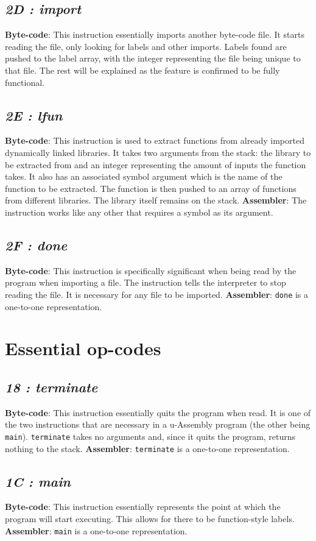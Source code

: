 \documentclass[12pt]{report}
\begin{document}
  \subsection{\emph{2D : import}}
  \textbf{Byte-code}: This instruction essentially imports another byte-code file.  It
  starts reading the file, only looking for labels and other imports.  Labels found are
  pushed to the label array, with the integer representing the file being unique to
  that file.  The rest will be explained as the feature is confirmed to be fully
  functional.
  \subsection{\emph{2E : lfun}}
  \textbf{Byte-code}: This instruction is used to extract functions from already
  imported dynamically linked libraries.  It takes two arguments from the stack:
  the library to be extracted from and an integer representing the amount of inputs
  the function takes.  It also has an associated symbol argument which is the name
  of the function to be extracted.  The function is then pushed to an array of
  functions from different libraries.  The library itself remains on the stack.
  \textbf{Assembler}: The instruction works like any other that requires a symbol
  as its argument.
  \subsection{\emph{2F : done}}
  \textbf{Byte-code}: This instruction is specifically significant when being read
  by the program when importing a file.  The instruction tells the interpreter to
  stop reading the file.  It is necessary for any file to be imported.
  \textbf{Assembler}: \verb|done| is a one-to-one representation.

  \section{Essential op-codes}
  \subsection{\emph{18 : terminate}}
  \textbf{Byte-code}: This instruction essentially quits the program when read.  It
  is one of the two instructions that are necessary in a u-Assembly program (the
  other being \verb|main|).  \verb|terminate| takes no arguments and, since it quits
  the program, returns nothing to the stack.\newline
  \textbf{Assembler}: \verb|terminate| is a one-to-one representation.
  \subsection{\emph{1C : main}}
  \textbf{Byte-code}: This instruction essentially represents the point at which the
  program will start executing.  This allows for there to be function-style labels.
  \newline
  \textbf{Assembler}: \verb|main| is a one-to-one representation.
\end{document}
